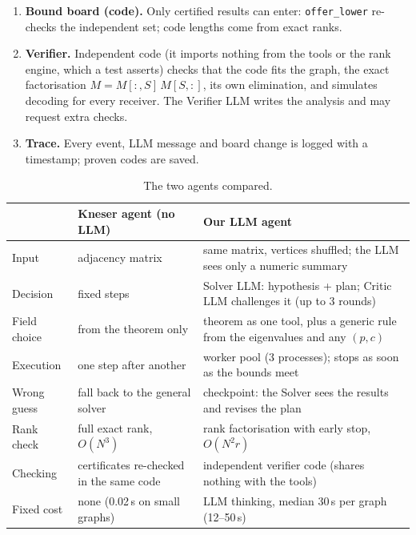 \begin{enumerate}
  once more than \texttt{cap} independent rows are found; (ii) invert $M[S,Q]$ with FLINT and set
  $C=M[:,Q]\,M[S,Q]^{-1}$; (iii) compute the residual $M-C\,M[S,:]$ in float64 BLAS blocks (exact, since every entry
  is $<p$ and $r(p-1)^2<2^{53}$); add any row with a nonzero residual and repeat. When every residual is zero,
  $\operatorname{rank}_p(M)=|S|$ exactly. With $\texttt{cap}=U-1$ a code that cannot improve the upper bound is
  abandoned early. Cost $O(N^2r)$ instead of FLINT's $O(N^3)$.
  \item \textbf{Bound board (code).} Only certified results can enter: \texttt{offer\_lower} re-checks the
  independent set; code lengths come from exact ranks.
  \item \textbf{Verifier.} Independent code (it imports nothing from the tools or the rank engine, which a test
  asserts) checks that the code fits the graph, the exact factorisation $M=M[:,S]\,M[S,:]$, its own elimination, and
  simulates decoding for every receiver. The Verifier LLM writes the analysis and may request extra checks.
  \item \textbf{Trace.} Every event, LLM message and board change is logged with a timestamp; proven codes are saved.
\end{enumerate}

\begin{table}[ht]
  \centering\small
  \begin{tabularx}{\textwidth}{@{}>{\raggedright\arraybackslash}p{2.3cm}>{\raggedright\arraybackslash}p{5.0cm}X@{}}
    \toprule
    & Kneser agent (no LLM) & Our LLM agent \\
    \midrule
    Input & adjacency matrix & same matrix, vertices shuffled; the LLM sees only a numeric summary \\
    Decision & 5 fixed steps & Solver LLM: hypothesis + plan; Critic LLM challenges it (up to 3 rounds) \\
    Field choice & from the theorem only & theorem as one tool, plus a generic rule from the eigenvalues and any $(p,c)$ \\
    Execution & one step after another & worker pool (3 processes); stops as soon as the bounds meet \\
    Wrong guess & fall back to the general solver & checkpoint: the Solver sees the results and revises the plan \\
    Rank check & full exact rank, $O(N^3)$ & rank factorisation with early stop, $O(N^2r)$ \\
    Checking & certificates re-checked in the same code & independent verifier code (shares nothing with the tools) \\
    Fixed cost & none (0.02\,s on small graphs) & LLM thinking, median 30\,s per graph (12--50\,s) \\
    \bottomrule
  \end{tabularx}
  \caption{The two agents compared.}
  \label{tab:agents}
\end{table}


